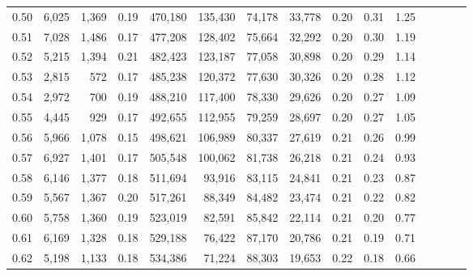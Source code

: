 \begin{tabular}{rrrcrrrrrrrrrrr}
0.50 &   6,025 &  1,369 &                                       0.19 &  470,180 &  135,430 &   74,178 &   33,778 &  0.20 &  0.31 &                         1.25 \\
0.51 &   7,028 &  1,486 &                                       0.17 &  477,208 &  128,402 &   75,664 &   32,292 &  0.20 &  0.30 &                         1.19 \\
0.52 &   5,215 &  1,394 &                                       0.21 &  482,423 &  123,187 &   77,058 &   30,898 &  0.20 &  0.29 &                         1.14 \\
0.53 &   2,815 &    572 &                                       0.17 &  485,238 &  120,372 &   77,630 &   30,326 &  0.20 &  0.28 &                         1.12 \\
0.54 &   2,972 &    700 &                                       0.19 &  488,210 &  117,400 &   78,330 &   29,626 &  0.20 &  0.27 &                         1.09 \\
0.55 &   4,445 &    929 &                                       0.17 &  492,655 &  112,955 &   79,259 &   28,697 &  0.20 &  0.27 &                         1.05 \\
0.56 &   5,966 &  1,078 &                                       0.15 &  498,621 &  106,989 &   80,337 &   27,619 &  0.21 &  0.26 &                         0.99 \\
0.57 &   6,927 &  1,401 &                                       0.17 &  505,548 &  100,062 &   81,738 &   26,218 &  0.21 &  0.24 &                         0.93 \\
0.58 &   6,146 &  1,377 &                                       0.18 &  511,694 &   93,916 &   83,115 &   24,841 &  0.21 &  0.23 &                         0.87 \\
0.59 &   5,567 &  1,367 &                                       0.20 &  517,261 &   88,349 &   84,482 &   23,474 &  0.21 &  0.22 &                         0.82 \\
0.60 &   5,758 &  1,360 &                                       0.19 &  523,019 &   82,591 &   85,842 &   22,114 &  0.21 &  0.20 &                         0.77 \\
0.61 &   6,169 &  1,328 &                                       0.18 &  529,188 &   76,422 &   87,170 &   20,786 &  0.21 &  0.19 &                         0.71 \\
0.62 &   5,198 &  1,133 &                                       0.18 &  534,386 &   71,224 &   88,303 &   19,653 &  0.22 &  0.18 &                         0.66 \\

\end{tabular}
